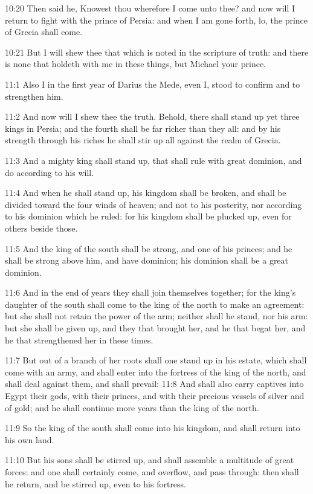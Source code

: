 10:20 Then said he, Knowest thou wherefore I come unto thee? and now will I return to fight with the prince of Persia: and when I am gone forth, lo, the prince of Grecia shall come.

10:21 But I will shew thee that which is noted in the scripture of truth: and there is none that holdeth with me in these things, but Michael your prince.

11:1 Also I in the first year of Darius the Mede, even I, stood to confirm and to strengthen him.

11:2 And now will I shew thee the truth. Behold, there shall stand up yet three kings in Persia; and the fourth shall be far richer than they all: and by his strength through his riches he shall stir up all against the realm of Grecia.

11:3 And a mighty king shall stand up, that shall rule with great dominion, and do according to his will.

11:4 And when he shall stand up, his kingdom shall be broken, and shall be divided toward the four winds of heaven; and not to his posterity, nor according to his dominion which he ruled: for his kingdom shall be plucked up, even for others beside those.

11:5 And the king of the south shall be strong, and one of his princes; and he shall be strong above him, and have dominion; his dominion shall be a great dominion.

11:6 And in the end of years they shall join themselves together; for the king's daughter of the south shall come to the king of the north to make an agreement: but she shall not retain the power of the arm; neither shall he stand, nor his arm: but she shall be given up, and they that brought her, and he that begat her, and he that strengthened her in these times.

11:7 But out of a branch of her roots shall one stand up in his estate, which shall come with an army, and shall enter into the fortress of the king of the north, and shall deal against them, and shall prevail: 11:8 And shall also carry captives into Egypt their gods, with their princes, and with their precious vessels of silver and of gold; and he shall continue more years than the king of the north.

11:9 So the king of the south shall come into his kingdom, and shall return into his own land.

11:10 But his sons shall be stirred up, and shall assemble a multitude of great forces: and one shall certainly come, and overflow, and pass through: then shall he return, and be stirred up, even to his fortress.


